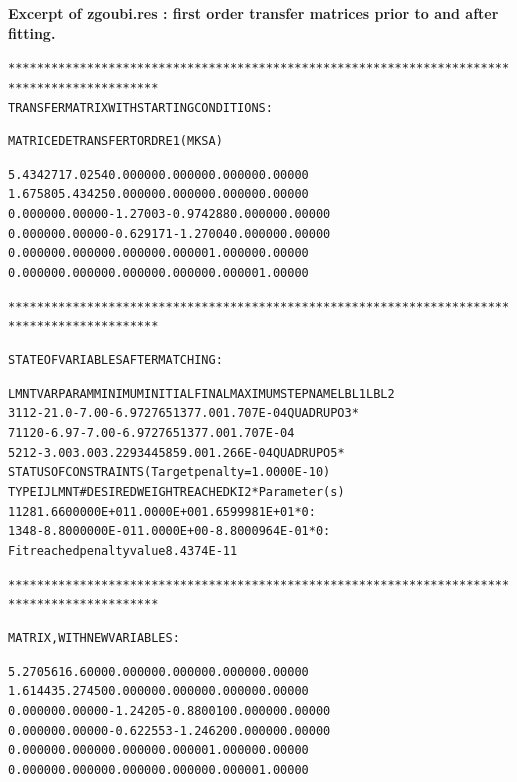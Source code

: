 \begin{center}
\clearpage

\twocolumn
\noindent \textbf{\normalsize Excerpt of zgoubi.res  : 
 first order transfer matrices prior to and after fitting.
}

\begin{scriptsize}
\begin{alltt}
*******************************************************************************************
 TRANSFER MATRIX WITH STARTING  CONDITIONS :


                  MATRICE  DE  TRANSFERT  ORDRE  1  ( MKSA )

    5.43427         17.0254         0.00000         0.00000         0.00000         0.00000    
    1.67580         5.43425         0.00000         0.00000         0.00000         0.00000    
    0.00000         0.00000        -1.27003       -0.974288         0.00000         0.00000    
    0.00000         0.00000       -0.629171        -1.27004         0.00000         0.00000    
    0.00000         0.00000         0.00000         0.00000         1.00000         0.00000    
    0.00000         0.00000         0.00000         0.00000         0.00000         1.00000    


*******************************************************************************************

STATE OF VARIABLES  AFTER  MATCHING :

 LMNT  VAR  PARAM  MINIMUM     INITIAL         FINAL         MAXIMUM      STEP     NAME       LBL1     LBL2
    3    1     12   -21.0       -7.00       -6.972765137       7.00      1.707E-04 QUADRUPO   3          *         
    7    1    120   -6.97       -7.00       -6.972765137       7.00      1.707E-04
    5    2     12   -3.00        3.00        3.229344585       9.00      1.266E-04 QUADRUPO   5          *         
 STATUS OF CONSTRAINTS (Target penalty =   1.0000E-10)
 TYPE  I   J  LMNT#       DESIRED           WEIGHT         REACHED         KI2         *  Parameter(s) 
   1   1   2     8      1.6600000E+01     1.0000E+00    1.6599981E+01                  *  0 : 
   1   3   4     8     -8.8000000E-01     1.0000E+00   -8.8000964E-01                  *  0 : 
 Fit reached penalty value   8.4374E-11

*******************************************************************************************

MATRIX, WITH NEW VARIABLES :

    5.27056         16.6000         0.00000         0.00000         0.00000         0.00000    
    1.61443         5.27450         0.00000         0.00000         0.00000         0.00000    
    0.00000         0.00000        -1.24205       -0.880010         0.00000         0.00000    
    0.00000         0.00000       -0.622553        -1.24620         0.00000         0.00000    
    0.00000         0.00000         0.00000         0.00000         1.00000         0.00000    
    0.00000         0.00000         0.00000         0.00000         0.00000         1.00000    


\end{alltt}
\end{scriptsize}
\end{center}
